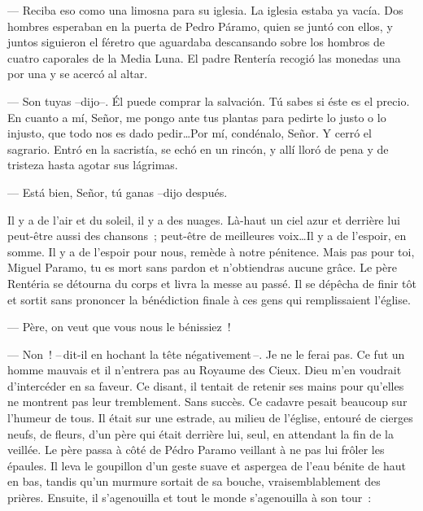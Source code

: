 \begin{pages}
\begin{Leftside}
			--- Reciba eso como una limosna para su iglesia.
		\pend
		\pstart
			La iglesia estaba ya vacía. Dos hombres esperaban en la puerta de Pedro Páramo, quien se juntó con ellos, y juntos siguieron el féretro que aguardaba descansando sobre los hombros de cuatro caporales de la Media Luna.
		\pend
		\pstart
			El padre Rentería recogió las monedas una por una y se acercó al altar.

			--- Son tuyas --dijo--. Él puede comprar la salvación. Tú sabes si éste es el precio. En cuanto a mí, Señor, me pongo ante tus plantas para pedirte lo justo o lo injusto, que todo nos es dado pedir\ldots Por mí, condénalo, Señor.
		\pend
		\pstart
			Y cerró el sagrario.
		\pend
		\pstart
			Entró en la sacristía, se echó en un rincón, y allí lloró de pena y de tristeza
			hasta agotar sus lágrimas.

			--- Está bien, Señor, tú ganas --dijo después.
		\pend
		\endnumbering
	\end{Leftside}
	\begin{Rightside}
		\beginnumbering
			\og{}Il y a de l'air et du soleil, il y a des nuages. Là-haut un ciel azur et derrière lui peut-être aussi des chansons ; peut-être de meilleures voix\ldots Il y a de l'espoir, en somme. Il y a de l'espoir pour nous, remède à notre pénitence.
		\pend
		\pstart
			\fg{}Mais pas pour toi, Miguel Paramo, tu es mort sans pardon et n'obtiendras aucune grâce.\fg{}
		\pend
		\pstart
			Le père Rentéria se détourna du corps et livra la messe au passé. Il se dépêcha de finir tôt et sortit sans prononcer la bénédiction finale à ces gens qui remplissaient l'église.

			--- Père, on veut que vous nous le bénissiez !

			--- Non ! --\,dit-il en hochant la tête négativement\,--. Je ne le ferai pas. Ce fut un homme mauvais et il n'entrera pas au Royaume des Cieux. Dieu m'en voudrait d'intercéder en sa faveur.
		\pend
		\pstart
			Ce disant, il tentait de retenir ses mains pour qu'elles ne montrent pas leur tremblement. Sans succès.
		\pend
		\pstart
			Ce cadavre pesait beaucoup sur l'humeur de tous. Il était sur une estrade, au milieu de l'église, entouré de cierges neufs, de fleurs, d'un père qui était derrière lui, seul, en attendant la fin de la veillée.
		\pend
		\pstart
			Le père passa à côté de Pédro Paramo veillant à ne pas lui frôler les épaules. Il leva le goupillon d'un geste suave et aspergea de l'eau bénite de haut en bas, tandis qu'un murmure sortait de sa bouche, vraisemblablement des prières. Ensuite, il s'agenouilla et tout le monde s'agenouilla à son tour :


\end{Rightside}
\end{pages}
